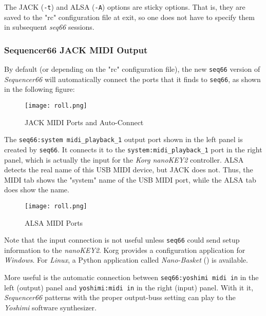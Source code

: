    The JACK (\texttt{-t}) and ALSA (\texttt{-A}) options are sticky options.
   That is, they are saved to the "rc" configuration file at exit,
   so one does not have to specify them in subsequent \textsl{seq66} sessions.

\subsubsection{Sequencer66 JACK MIDI Output}
\label{subsubsec:seq66_jack_midi_output}

   By default (or depending on the "rc" configuration file), the new
   \texttt{seq66} version of \textsl{Sequencer66} will
   automatically connect the ports that it finds to \texttt{seq66},
   as shown in the following figure:

\begin{figure}[H]
   \centering 
   \texttt{[image: roll.png]}
   \caption{JACK MIDI Ports and Auto-Connect}
   \label{fig:seq66_jack_nano_yosh_midi_auto}
\end{figure}

   The \texttt{seq66:system midi\_playback\_1} output port shown
   in the left panel is created by \texttt{seq66}.  It connects it to the 
   \texttt{system:midi\_playback\_1} port in the right panel, which
   is actually the input for the \textsl{Korg nanoKEY2} controller.
   ALSA detects the real name of this USB MIDI device, but JACK does not.  
   Thus, the MIDI tab shows the "system" name of the USB MIDI port, while
   the ALSA tab does show the name.

\begin{figure}[H]
   \centering 
   \texttt{[image: roll.png]}
   \caption{ALSA MIDI Ports}
   \label{fig:seq66_jack_nano_yosh_alsa_pre}
\end{figure}

	Note that the input connection is not useful unless \texttt{seq66} could
   send setup information to the \textsl{nanoKEY2}.
   Korg provides a configuration application for \textsl{Windows}.
   For \textsl{Linux}, a Python application called \textsl{Nano-Basket}
	(\cite{nanobasket}) is available.

   More useful is the automatic connection between
   \texttt{seq66:yoshimi midi in} in the left (output) panel and
   \texttt{yoshimi:midi in} in the right (input) panel.  With it it,
   \textsl{Sequencer66} patterns with the proper output-buss setting can play
   to the \textsl{Yoshimi} software synthesizer.

